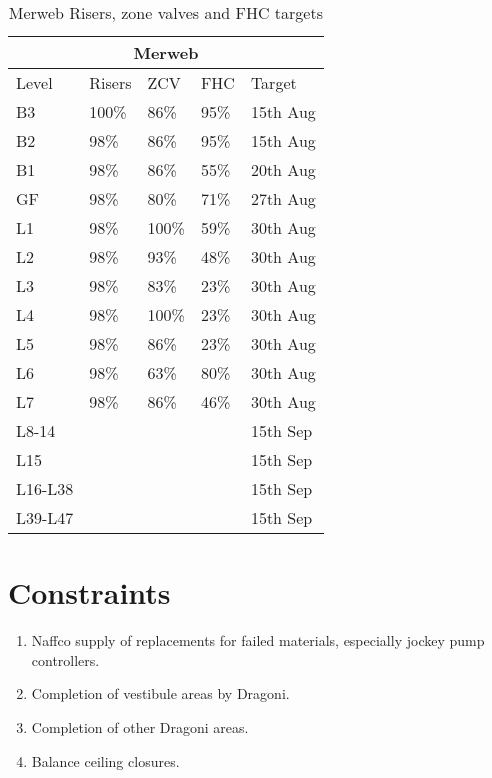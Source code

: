 \begin{table}[htbp]\label{tbl:fire3}
\begin{center}
\begin{tabular}{lllll}
\toprule
\multicolumn{5}{c}{Merweb}\\
\midrule
Level	&Risers &ZCV	&FHC  &Target\\
\midrule
B3	&100\% &86\%	 &95\%  &15th Aug\\
B2	&98\%	  &86\%	&95\%   &15th Aug\\
\midrule
B1	&98\%	 &86\%	&55\%  &20th Aug\\
GF	&98\%	 &80\%	&71\%  &27th Aug\\
\midrule
L1	&98\%	 &100\%	&59\%  &30th Aug\\
L2	&98\%	 &93\%	&48\%  &30th Aug\\
L3	&98\%	 &83\%	&23\%  &30th Aug\\
L4	&98\%	 &100\%	&23\%  &30th Aug\\
L5	&98\%	 &86\%	&23\%  &30th Aug\\
L6	&98\%	 &63\%	&80\%  &30th Aug\\
L7	&98\%	&86\%	&46\%              &30th Aug\\
\midrule
L8-14	&         &          &      &15th Sep\\ 	 	 
L15	&        &           &      &15th Sep\\ 	 	 
L16-L38 &      &           &      &15th Sep\\	 	 	 
L39-L47 &      &           &      &15th Sep\\	 	 	 
\bottomrule
\end{tabular}
\caption{Merweb Risers, zone valves and FHC targets}
\end{center}
\end{table}




\section{Constraints}

\begin{enumerate}
\item Naffco supply of replacements for failed materials, especially jockey pump controllers.
\item Completion of vestibule areas by Dragoni.
\item Completion of other Dragoni areas.
\item Balance ceiling closures.
\end{enumerate}

